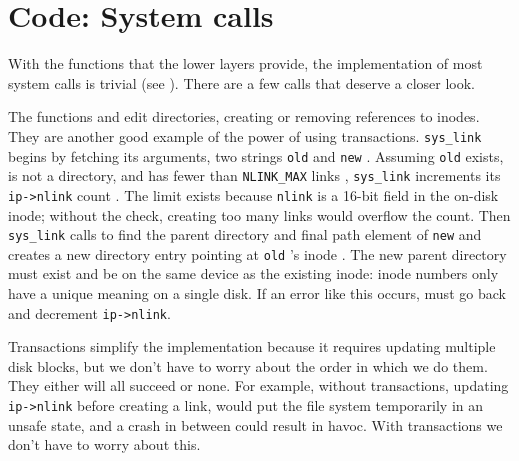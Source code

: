 \section{Code: System calls}

With the functions that the lower layers provide, the implementation of most
system calls is trivial
(see
).
There are a few calls that
deserve a closer look.

The functions
and
edit directories, creating or removing references to inodes.
They are another good example of the power of using 
transactions. 
\lstinline{sys_link}
begins by fetching its arguments, two strings
\lstinline{old}
and
\lstinline{new}
.
Assuming 
\lstinline{old}
exists, is not a directory, and has fewer than
\lstinline{NLINK_MAX}
links
,
\lstinline{sys_link}
increments its 
\lstinline{ip->nlink}
count
.
The limit exists because
\lstinline{nlink}
is a 16-bit field in the on-disk inode; without the check,
creating too many links would overflow the count.
Then
\lstinline{sys_link}
calls
to find the parent directory and final path element of
\lstinline{new} 
and creates a new directory entry pointing at
\lstinline{old} 's
inode
.
The new parent directory must exist and
be on the same device as the existing inode:
inode numbers only have a unique meaning on a single disk.
If an error like this occurs, 
must go back and decrement
\lstinline{ip->nlink}.

Transactions simplify the implementation because it requires updating multiple
disk blocks, but we don't have to worry about the order in which we do
them. They either will all succeed or none.
For example, without transactions, updating
\lstinline{ip->nlink}
before creating a link, would put the file system temporarily in an unsafe
state, and a crash in between could result in havoc.
With transactions we don't have to worry about this.

